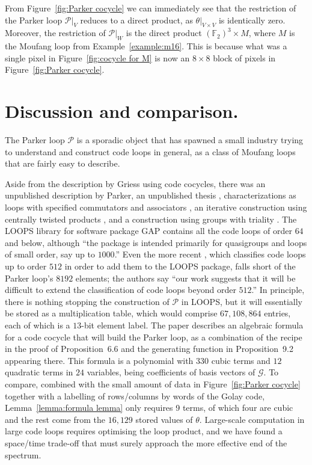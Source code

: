 \documentclass{article}
\theoremstyle{plain}
\theoremstyle{definition}
\def \cG {\mathcal{G}}
\def \cP {\mathcal{P}}
\def \FF {\mathbb{F}}
\begin{document}
From Figure~\ref{fig:Parker cocycle} we can immediately see that the restriction of the Parker loop $\cP\big|_V$ reduces to a direct product, as $\theta\big|_{V\times V}$ is identically zero. 
Moreover, the restriction of $\cP\big|_W$ is the direct product $(\FF_2)^3 \times M$, where $M$ is the Moufang loop from Example~\ref{example:m16}.
This is because what was a single pixel in Figure~\ref{fig:cocycle for M} is now an $8\times 8$ block of pixels in Figure~\ref{fig:Parker cocycle}.

\section{Discussion and comparison.}

The Parker loop $\cP$ is a sporadic object that has spawned a small industry trying to understand and construct code loops in general, as a class of Moufang loops that are fairly easy to describe.

Aside from the description by Griess using code cocycles, there was an unpublished description by Parker, an unpublished thesis \cite{Johnson}, characterizations as loops with specified commutators and associators \cite{CheinGoodaire}, an iterative construction using centrally twisted products \cite{Hsu}, and a construction using groups with triality \cite{Nagy}. 
The LOOPS library \cite{LOOPS} for software package GAP \cite{GAP4} contains all the code loops of order $64$ and below, although ``the package is intended primarily for quasigroups and loops of small order, say up to $1000$.''
Even the more recent \cite{OBrien_Vojtechovsky}, which classifies code loops up to order $512$ in order to add them to the LOOPS package, falls short of the Parker loop's $8192$ elements; the authors say ``our work suggests that it will be difficult to extend the classification of code loops beyond order $512$.''
In principle, there is nothing stopping the construction of $\cP$ in LOOPS, but it will essentially be stored as a multiplication table, which would comprise $67,108,864$ entries, each of which is a $13$-bit element label.
The paper \cite{Morier-Genoud_Ovsienko} describes an algebraic formula for a code cocycle that will build the Parker loop, as a combination of the recipe in the proof of Proposition~6.6 and the generating function in Proposition~9.2 appearing there.
This formula is a polynomial with $330$ cubic terms and $12$ quadratic terms in $24$ variables, being coefficients of basis vectors of $\cG$. 
To compare, combined with the small amount of data in Figure~\ref{fig:Parker cocycle} together with a labelling of rows/columns by words of the Golay code, Lemma~\ref{lemma:formula lemma} only requires 9 terms, of which four are cubic and the rest come from the $16,129$ stored values of $\theta$.
Large-scale computation in large code loops requires optimising the loop product, and we have found a space/time trade-off that must surely approach the more effective end of the spectrum.
\end{document}
